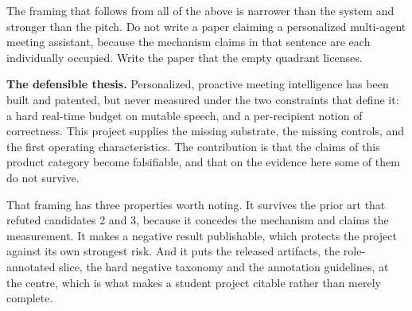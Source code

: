 The framing that follows from all of the above is narrower than the system and
stronger than the pitch. Do not write a paper claiming a personalized
multi-agent meeting assistant, because the mechanism claims in that sentence
are each individually occupied. Write the paper that the empty quadrant
licenses.

\begin{takeaway}
\textbf{The defensible thesis.} Personalized, proactive meeting intelligence
has been built and patented, but never measured under the two constraints that
define it: a hard real-time budget on mutable speech, and a per-recipient
notion of correctness. This project supplies the missing substrate, the missing
controls, and the first operating characteristics. The contribution is that the
claims of this product category become falsifiable, and that on the evidence
here some of them do not survive.
\end{takeaway}

That framing has three properties worth noting. It survives the prior art that
refuted candidates 2 and 3, because it concedes the mechanism and claims the
measurement. It makes a negative result publishable, which protects the project
against its own strongest risk. And it puts the released artifacts, the
role-annotated slice, the hard negative taxonomy and the annotation guidelines,
at the centre, which is what makes a student project citable rather than merely
complete.
